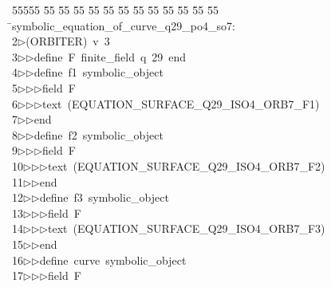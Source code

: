 %
%
\begin{tabbing}
55555 \= 55 \= 55 \= 55 \= 55 \= 55 \= 55 \= 55 \= 55 \= 55 \= 55 \= 55 \= 55 \= \>symbolic\_equation\_of\_curve\_q29\_po4\_so7:\\[0pt]
2\>$\triangleright$\>(ORBITER)\ v\ 3\ \\[0pt]
3\>$\triangleright$\>$\triangleright$\>define\ F\ finite\_field\ q\ 29\ end\ \\[0pt]
4\>$\triangleright$\>$\triangleright$\>define\ f1\ symbolic\_object\ \\[0pt]
5\>$\triangleright$\>$\triangleright$\>$\triangleright$\>field\ F\ \\[0pt]
6\>$\triangleright$\>$\triangleright$\>$\triangleright$\>text\ (EQUATION\_SURFACE\_Q29\_ISO4\_ORB7\_F1)\ \\[0pt]
7\>$\triangleright$\>$\triangleright$\>end\ \\[0pt]
8\>$\triangleright$\>$\triangleright$\>define\ f2\ symbolic\_object\ \\[0pt]
9\>$\triangleright$\>$\triangleright$\>$\triangleright$\>field\ F\ \\[0pt]
10\>$\triangleright$\>$\triangleright$\>$\triangleright$\>text\ (EQUATION\_SURFACE\_Q29\_ISO4\_ORB7\_F2)\ \\[0pt]
11\>$\triangleright$\>$\triangleright$\>end\ \\[0pt]
12\>$\triangleright$\>$\triangleright$\>define\ f3\ symbolic\_object\ \\[0pt]
13\>$\triangleright$\>$\triangleright$\>$\triangleright$\>field\ F\ \\[0pt]
14\>$\triangleright$\>$\triangleright$\>$\triangleright$\>text\ (EQUATION\_SURFACE\_Q29\_ISO4\_ORB7\_F3)\ \\[0pt]
15\>$\triangleright$\>$\triangleright$\>end\ \\[0pt]
16\>$\triangleright$\>$\triangleright$\>define\ curve\ symbolic\_object\ \\[0pt]
17\>$\triangleright$\>$\triangleright$\>$\triangleright$\>field\ F\ \\[0pt]

\end{tabbing}
